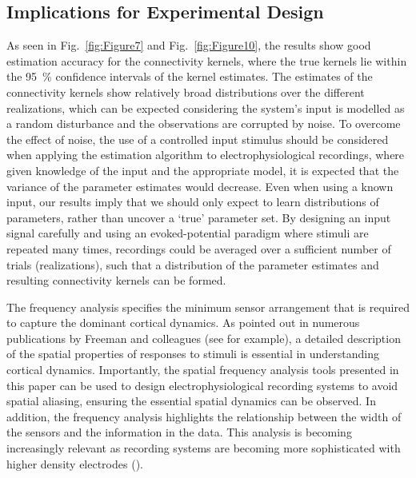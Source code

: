 \documentclass[5p,authoryear]{elsarticle}
\begin{document}
\subsection{Implications for Experimental Design}
As seen in Fig.~\ref{fig:Figure7} and Fig.~\ref{fig:Figure10}, the results show good estimation accuracy for the connectivity kernels, where the true kernels lie within the 95~\% confidence intervals of the kernel estimates. The estimates of the connectivity kernels show relatively broad distributions over the different realizations, which can be expected considering the system's input is modelled as a random disturbance and the observations are corrupted by noise. To overcome the effect of noise, the use of a controlled input stimulus should be considered when applying the estimation algorithm to electrophysiological recordings, where given knowledge of the input and the appropriate model, it is expected that the variance of the parameter estimates would decrease. Even when using a known input, our results imply that we should only expect to learn distributions of parameters, rather than uncover a `true' parameter set. By designing an input signal carefully and using an evoked-potential paradigm where stimuli are repeated many times, recordings could be averaged over a sufficient number of trials (realizations), such that a distribution of the parameter estimates and resulting connectivity kernels can be formed.

The frequency analysis specifies the minimum sensor arrangement that is required to capture the dominant cortical dynamics. As pointed out in numerous publications by Freeman and colleagues (see \cite{Freeman1987} for example), a detailed description of the spatial properties of responses to stimuli is essential in understanding cortical dynamics. Importantly, the spatial frequency analysis tools presented in this paper can be used to design electrophysiological recording systems to avoid spatial aliasing, ensuring the essential spatial dynamics can be observed. In addition, the frequency analysis highlights the relationship between the width of the sensors and the information in the data. This analysis is becoming increasingly relevant as recording systems are becoming more sophisticated with higher density electrodes (\cite{Brinkmann2009}).
\end{document}
